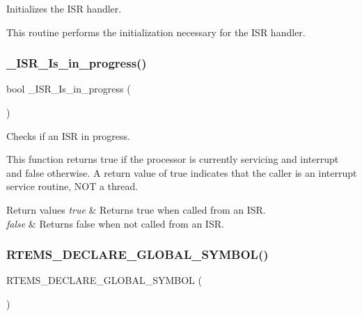 Initializes the I\+SR handler. 

This routine performs the initialization necessary for the I\+SR handler. \mbox{\label{group__RTEMSScoreISR_ga3b125bb9faac2fa94bd0ba0583cf5f77}} 
\subsubsection{\texorpdfstring{\_ISR\_Is\_in\_progress()}{\_ISR\_Is\_in\_progress()}}
{\footnotesize\ttfamily bool \+\_\+\+I\+S\+R\+\_\+\+Is\+\_\+in\+\_\+progress (\begin{DoxyParamCaption}\item[{void}]{ }\end{DoxyParamCaption})}



Checks if an I\+SR in progress. 

This function returns true if the processor is currently servicing and interrupt and false otherwise. A return value of true indicates that the caller is an interrupt service routine, N\+OT a thread.


\begin{DoxyRetVals}{Return values}
{\em true} & Returns true when called from an I\+SR. \\
\hline
{\em false} & Returns false when not called from an I\+SR. \\
\hline
\end{DoxyRetVals}
\mbox{\label{group__RTEMSScoreISR_gab90dca799ff51b1e1901a42d45e1f7cc}} 
\subsubsection{\texorpdfstring{RTEMS\_DECLARE\_GLOBAL\_SYMBOL()}{RTEMS\_DECLARE\_GLOBAL\_SYMBOL()}}
{\footnotesize\ttfamily R\+T\+E\+M\+S\+\_\+\+D\+E\+C\+L\+A\+R\+E\+\_\+\+G\+L\+O\+B\+A\+L\+\_\+\+S\+Y\+M\+B\+OL (\begin{DoxyParamCaption}\item[{\+\_\+\+I\+S\+R\+\_\+\+Stack\+\_\+size}]{ }\end{DoxyParamCaption})}



